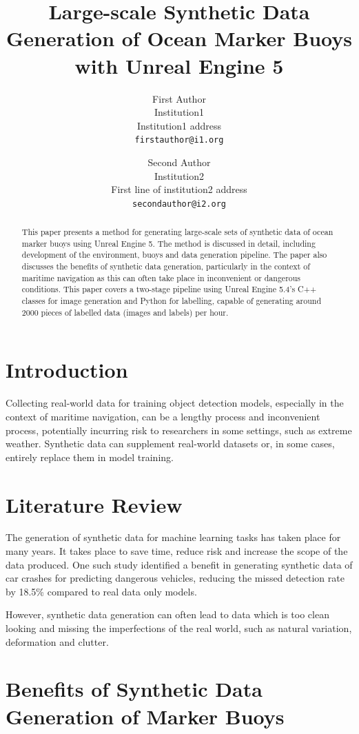 \documentclass[10pt,twocolumn,letterpaper]{article}
\title{Large-scale Synthetic Data Generation of Ocean Marker Buoys with Unreal Engine 5}
\author{First Author\\
Institution1\\
Institution1 address\\
{\tt\small firstauthor@i1.org}
\and
Second Author\\
Institution2\\
First line of institution2 address\\
{\tt\small secondauthor@i2.org}
}
\begin{document}
\maketitle

\begin{abstract}
    This paper presents a method for generating large-scale sets of synthetic data of ocean marker buoys using Unreal Engine 5. The method is discussed in detail, including development of the environment, buoys and data generation pipeline. The paper also discusses the benefits of synthetic data generation, particularly in the context of maritime navigation as this can often take place in inconvenient or dangerous conditions. This paper covers a two-stage pipeline using Unreal Engine 5.4's C++ classes for image generation and Python for labelling, capable of generating around 2000 pieces of labelled data (images and labels) per hour.
    \end{abstract}

\section{Introduction}

Collecting real-world data for training object detection models, especially in the context of maritime navigation, can be a lengthy process and inconvenient process, potentially incurring risk to researchers in some settings, such as extreme weather. Synthetic data can supplement real-world datasets or, in some cases, entirely replace them in model training.

\section{Literature Review}

The generation of synthetic data for machine learning tasks has taken place for many years. It takes place to save time, reduce risk and increase the scope of the data produced. One such study identified a benefit in generating synthetic data of car crashes for predicting dangerous vehicles, reducing the missed detection rate by 18.5\% compared to real data only models. \cite{Kim_Lee_Hwang_Suh_2019} 

However, synthetic data generation can often lead to data which is too clean looking and missing the imperfections of the real world, such as natural variation, deformation and clutter. \cite{Feng_2024_CVPR}

\section{Benefits of Synthetic Data Generation of Marker Buoys}
\end{document}
